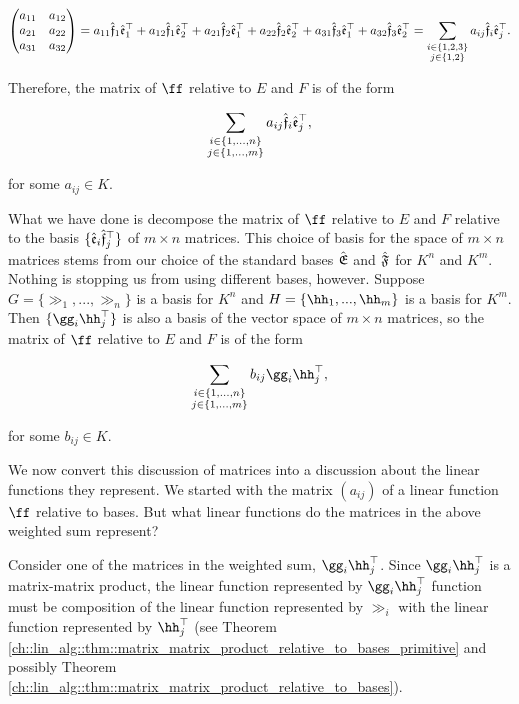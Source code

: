 \begin{align*}
    \begin{pmatrix}
        a_{11} & a_{12} \\
        a_{21} & a_{22} \\
        a_{31} & a_{32}
    \end{pmatrix}
    =
    a_{11} \hat{\mathfrak{f}}_1 \hat{\mathfrak{e}}_1^\top + a_{12} \hat{\mathfrak{f}}_1 \hat{\mathfrak{e}}_2^\top 
    + a_{21} \hat{\mathfrak{f}}_2 \hat{\mathfrak{e}}_1^\top + a_{22} \hat{\mathfrak{f}}_2 \hat{\mathfrak{e}}_2^\top +
    a_{31} \hat{\mathfrak{f}}_3 \hat{\mathfrak{e}}_1^\top + a_{32} \hat{\mathfrak{f}}_3 \hat{\mathfrak{e}}_2^\top
    = \sum_{\substack{i \in \{1, 2, 3\} \\ j \in \{1, 2\}}} a_{ij} \hat{\mathfrak{f}}_i \hat{\mathfrak{e}}_j^\top.
\end{align*}

Therefore, the matrix of $\ff$ relative to $E$ and $F$ is of the form

\begin{align*}
    \sum_{\substack{i \in \{1, ..., n\} \\ j \in \{1, ..., m\}}} a_{ij} \hat{\mathfrak{f}}_i \hat{\mathfrak{e}}_j^\top,
\end{align*}

for some $a_{ij} \in K$.

What we have done is decompose the matrix of $\ff$ relative to $E$ and $F$ relative to the basis $\{ \hat{\mathfrak{e}}_i \hat{\mathfrak{f}}_j^\top \}$ of $m \times n$ matrices. This choice of basis for the space of $m \times n$ matrices stems from our choice of the standard bases ${\hat{\mathfrak{E}}}$ and ${\hat{\mathfrak{F}}}$ for $K^n$ and $K^m$. Nothing is stopping us from using different bases, however. Suppose $G = \{\gg_1, ..., \gg_n\}$ is a basis for $K^n$ and $H = \{\hh_1, ..., \hh_m\}$ is a basis for $K^m$. Then $\{ \gg_i \hh_j^\top \}$ is also a basis of the vector space of $m \times n$ matrices, so the matrix of $\ff$ relative to $E$ and $F$ is of the form

\begin{align*}
    \sum_{\substack{i \in \{1, ..., n\} \\ j \in \{1, ..., m\}}} b_{ij} \gg_i \hh_j^\top,
\end{align*}

for some $b_{ij} \in K$.

We now convert this discussion of matrices into a discussion about the linear functions they represent. We started with the matrix $(a_{ij})$ of a linear function $\ff$ relative to bases. But what linear functions do the matrices in the above weighted sum represent? 

Consider one of the matrices in the weighted sum, $\gg_i \hh_j^\top$. Since $\gg_i \hh_j^\top$ is a matrix-matrix product, the linear function represented by $\gg_i \hh_j^\top$ function must be composition of the linear function represented by $\gg_i$ with the linear function represented by $\hh_j^\top$ (see Theorem \ref{ch::lin_alg::thm::matrix_matrix_product_relative_to_bases_primitive} and possibly Theorem \ref{ch::lin_alg::thm::matrix_matrix_product_relative_to_bases}).

